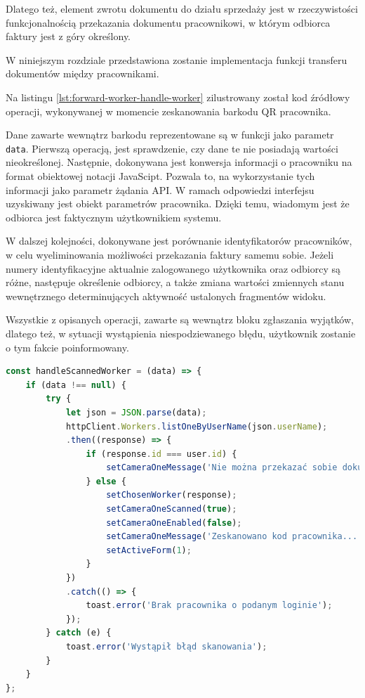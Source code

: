 Dlatego też, element zwrotu dokumentu do działu sprzedaży jest w rzeczywistości funkcjonalnością przekazania dokumentu pracownikowi, w którym odbiorca faktury jest z góry określony.

W niniejszym rozdziale przedstawiona zostanie implementacja funkcji transferu dokumentów między pracownikami.

Na listingu \ref{lst:forward-worker-handle-worker} zilustrowany został kod źródłowy operacji, wykonywanej w momencie zeskanowania barkodu QR pracownika.

Dane zawarte wewnątrz barkodu reprezentowane są w funkcji jako parametr \texttt{data}. Pierwszą operacją, jest sprawdzenie, czy dane te nie posiadają wartości nieokreślonej. Następnie, dokonywana jest konwersja informacji o pracowniku na format obiektowej notacji JavaScipt. Pozwala to, na wykorzystanie tych informacji jako parametr żądania API. W ramach odpowiedzi interfejsu uzyskiwany jest obiekt parametrów pracownika. Dzięki temu, wiadomym jest że odbiorca jest faktycznym użytkownikiem systemu.

W dalszej kolejności, dokonywane jest porównanie identyfikatorów pracowników, w celu wyeliminowania możliwości przekazania faktury samemu sobie. Jeżeli numery identyfikacyjne aktualnie zalogowanego użytkownika oraz odbiorcy są różne, następuje określenie odbiorcy, a także zmiana wartości zmiennych stanu wewnętrznego determinujących aktywność ustalonych fragmentów widoku.

Wszystkie z opisanych operacji, zawarte są wewnątrz bloku zgłaszania wyjątków, dlatego też, w sytuacji wystąpienia niespodziewanego błędu, użytkownik zostanie o tym fakcie poinformowany.

\begin{lstlisting}[label=lst:forward-worker-handle-worker,caption=Kod funkcji wykonywanej po zeskanowaniu barkodu pracownika, captionpos=b,basicstyle=\footnotesize\ttfamily,language=JavaScript]
const handleScannedWorker = (data) => {
	if (data !== null) {
		try {
			let json = JSON.parse(data);
			httpClient.Workers.listOneByUserName(json.userName);
			.then((response) => {
				if (response.id === user.id) {
					setCameraOneMessage('Nie można przekazać sobie dokumentu');
				} else {
					setChosenWorker(response);
					setCameraOneScanned(true);
					setCameraOneEnabled(false);
					setCameraOneMessage('Zeskanowano kod pracownika...');
					setActiveForm(1);
				}
			})
			.catch(() => {
				toast.error('Brak pracownika o podanym loginie');
			});
		} catch (e) {
			toast.error('Wystąpił błąd skanowania');
		}
	}
};
\end{lstlisting}

